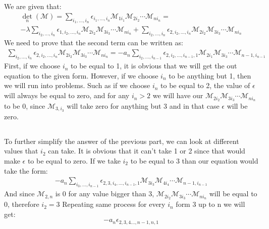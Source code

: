 \documentclass[12pt]{article}
\begin{document}
\subsection{}
We are given that:
\begin{equation}
\begin{gathered}
    \det_n(\mathcal{M}) = \sum_{i_1,...,i_n}\epsilon_{i_1,...,i_n}\mathcal{M}_{1i_1}\mathcal{M}_{2i_2}\cdots\mathcal{M}_{ni_n} = \\
    -\lambda\sum_{i_2,...,i_n}\epsilon_{1,i_2,...,i_n}\mathcal{M}_{2i_2}\mathcal{M}_{3i_3}\cdots\mathcal{M}_{ni_n}+
    \sum_{i_2,...,i_{n}}\epsilon_{2,i_2,...,i_{n}}\mathcal{M}_{2i_2}\mathcal{M}_{3i_3}\cdots\mathcal{M}_{ni_n}
\end{gathered}
\end{equation}
We need to prove that the second term can be written as:
\begin{equation}
    \begin{gathered}
    \sum_{i_2,...,i_{n}}\epsilon_{2,i_2,...,i_{n}}\mathcal{M}_{2i_2}\mathcal{M}_{3i_3}\cdots\mathcal{M}_{ni_n} 
     =  -a_n\sum_{i_2,...,i_{n-1}}\epsilon_{2,i_2,...,i_{n-1},1}\mathcal{M}_{2i_1}\mathcal{M}_{3i_3}\cdots\mathcal{M}_{n-1,i_{n-1}}
    \end{gathered}
\end{equation}
First, if we choose $i_n$ to be equal to 1, it is obvious that we will get the out equation to the given form. However, if we choose $i_n$ to be anything but 1, then we will run into problems. Such as if we choose $i_n$ to be equal to 2, the value of $\epsilon$ will always be equal to zero, and for any $i_n > 2$ we will have our $\mathcal{M}_{2i_2}\mathcal{M}_{3i_3}\cdots\mathcal{M}_{ni_n}$ to be 0, since $\mathcal{M}_{3,i_3}$ will take zero for anything but 3 and in that case $\epsilon$ will be zero.
\subsection{}
To further simplify the answer of the previous part, we can look at different values that $i_2$ can take. It is obvious that it can't take 1 or 2 since that would make $\epsilon$ to be equal to zero. If we take $i_2$ to be equal to 3 than our equation would take the form:
\begin{equation}
    \begin{gathered}
        -a_n\sum_{i_3,...,i_{n-1}}\epsilon_{2,3,i_4,...,i_{n-1},1}\mathcal{M}_{3i_3}\mathcal{M}_{4i_4}\cdots\mathcal{M}_{n-1,i_{n-1}}
    \end{gathered}
\end{equation}
And since $\mathcal{M}_{2,n}$ is 0 for any value bigger than 3, $\mathcal{M}_{2i_2}\mathcal{M}_{3i_3}\cdots\mathcal{M}_{ni_n}$ will be equal to 0, therefore $i_2 = 3$
Repeating same process for every $i_n$ form 3 up to n we will get:
\begin{equation}
    -a_n\epsilon_{2,3,4...,n-1,n,1}
\end{equation}
\end{document}
